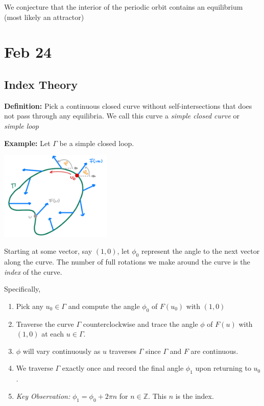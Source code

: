 \documentclass[12pt]{report}
\newcommand{\Z}{\mathbb{Z}}
\newcommand*{\tbf}[1]{\ifmmode\mathbf{#1}\else\textbf{#1}\fi}
\begin{document}
We conjecture that the interior of the periodic orbit contains an equilibrium (most likely an attractor)

\section{Feb 24}
\subsection{Index Theory}

\tbf{Definition:} Pick a continuous closed curve without self-intersections that does not pass through any equilibria. We call this curve a \emph{simple closed curve} or \emph{simple loop}

\tbf{Example:} Let $\Gamma$ be a simple closed loop.

\begin{center}
    \includegraphics[width=0.4\textwidth]{Images/FEB24 - Index def.png}
\end{center}

Starting at some vector, say $(1, 0)$, let $\phi_0$ represent the angle to the next vector along the curve. The number of full rotations we make around the curve is the \emph{index} of the curve.

Specifically,
\begin{enumerate}
    \item Pick any $u_0 \in \Gamma$ and compute the angle $\phi_0$ of $F(u_0)$ with $(1, 0)$
    \item Traverse the curve $\Gamma$ counterclockwise and trace the angle $\phi$ of $F(u)$ with $(1, 0)$ at each $u \in \Gamma$.
    \item $\phi$ will vary continuously as $u$ traverses $\Gamma$ since $\Gamma$ and $F$ are continuous.
    \item We traverse $\Gamma$ exactly once and record the final angle $\phi_1$ upon returning to $u_0$.
    \item \emph{Key Observation:} $\phi_1 = \phi_0 + 2\pi n$ for $n \in \Z$. This $n$ is the index.
\end{enumerate}
\end{document}
